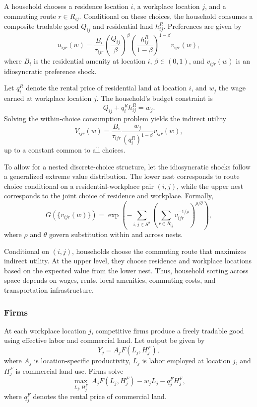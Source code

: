 \documentclass[12pt, a4paper]{article}
\begin{document}
A household chooses a residence location \(i\), a workplace location \(j\), and a commuting route \(r \in R_{ij}\). Conditional on these choices, the household consumes a composite tradable good \(Q_{ij}\) and residential land \(h_{ij}^R\). Preferences are given by
\[
u_{ijr}(w)=\frac{B_i}{\tau_{ijr}}
\left(\frac{Q_{ij}}{\beta}\right)^{\beta}
\left(\frac{h_{ij}^R}{1-\beta}\right)^{1-\beta}
v_{ijr}(w),
\]
where \(B_i\) is the residential amenity at location \(i\), \(\beta \in (0,1)\), and \(v_{ijr}(w)\) is an idiosyncratic preference shock.

Let \(q_i^R\) denote the rental price of residential land at location \(i\), and \(w_j\) the wage earned at workplace location \(j\). The household's budget constraint is
\[
Q_{ij}+q_i^R h_{ij}^R = w_j.
\]
Solving the within-choice consumption problem yields the indirect utility
\[
V_{ijr}(w)=\frac{B_i}{\tau_{ijr}}
\frac{w_j}{(q_i^R)^{1-\beta}}v_{ijr}(w),
\]
up to a constant common to all choices.

To allow for a nested discrete-choice structure, let the idiosyncratic shocks follow a generalized extreme value distribution. The lower nest corresponds to route choice conditional on a residential-workplace pair \((i,j)\), while the upper nest corresponds to the joint choice of residence and workplace. Formally,
\[
G(\{v_{ijr}(w)\})
=
\exp \left(
-\sum_{i,j\in S^2}
\left(
\sum_{r\in R_{ij}} v_{ijr}^{-1/\rho}
\right)^{\rho/\theta}
\right),
\]
where \(\rho\) and \(\theta\) govern substitution within and across nests.

Conditional on \((i,j)\), households choose the commuting route that maximizes indirect utility. At the upper level, they choose residence and workplace locations based on the expected value from the lower nest. Thus, household sorting across space depends on wages, rents, local amenities, commuting costs, and transportation infrastructure.

\subsubsection{Firms}

At each workplace location \(j\), competitive firms produce a freely tradable good using effective labor and commercial land. Let output be given by
\[
Y_j = A_j F(L_j, H_j^F),
\]
where \(A_j\) is location-specific productivity, \(L_j\) is labor employed at location \(j\), and \(H_j^F\) is commercial land use. Firms solve
\[
\max_{L_j,H_j^F}
\; A_j F(L_j,H_j^F)-w_jL_j-q_j^F H_j^F,
\]
where \(q_j^F\) denotes the rental price of commercial land.
\end{document}
